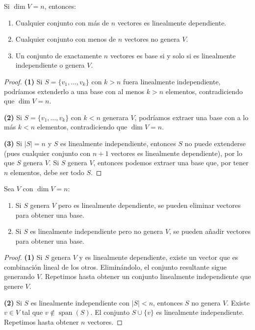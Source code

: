 \begin{theorem}
Si $\dim V = n$, entonces:
\begin{enumerate}
\item Cualquier conjunto con más de $n$ vectores es linealmente dependiente.
\item Cualquier conjunto con menos de $n$ vectores no genera $V$.
\item Un conjunto de exactamente $n$ vectores es base si y solo si es linealmente independiente o genera $V$.
\end{enumerate}
\begin{proof}
\textbf{(1)} Si $S = \{v_1, \ldots, v_k\}$ con $k > n$ fuera linealmente independiente, podríamos extenderlo a una base con al menos $k > n$ elementos, contradiciendo que $\dim V = n$.

\textbf{(2)} Si $S = \{v_1, \ldots, v_k\}$ con $k < n$ generara $V$, podríamos extraer una base con a lo más $k < n$ elementos, contradiciendo que $\dim V = n$.

\textbf{(3)} Si $|S| = n$ y $S$ es linealmente independiente, entonces $S$ no puede extenderse (pues cualquier conjunto con $n+1$ vectores es linealmente dependiente), por lo que $S$ genera $V$. Si $S$ genera $V$, entonces podemos extraer una base que, por tener $n$ elementos, debe ser todo $S$.
\end{proof}
\end{theorem}

\begin{theorem}
Sea $V$ con $\dim V = n$:
\begin{enumerate}
\item Si $S$ genera $V$ pero es linealmente dependiente, se pueden eliminar vectores para obtener una base.
\item Si $S$ es linealmente independiente pero no genera $V$, se pueden añadir vectores para obtener una base.
\end{enumerate}
\begin{proof}
\textbf{(1)} Si $S$ genera $V$ y es linealmente dependiente, existe un vector que es combinación lineal de los otros. Eliminándolo, el conjunto resultante sigue generando $V$. Repetimos hasta obtener un conjunto linealmente independiente que genere $V$.

\textbf{(2)} Si $S$ es linealmente independiente con $|S| < n$, entonces $S$ no genera $V$. Existe $v \in V$ tal que $v \notin \operatorname{span}(S)$. El conjunto $S \cup \{v\}$ es linealmente independiente. Repetimos hasta obtener $n$ vectores.
\end{proof}
\end{theorem}

